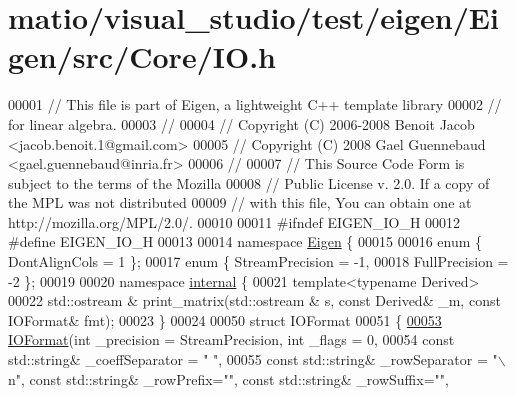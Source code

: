 \hypertarget{matio_2visual__studio_2test_2eigen_2_eigen_2src_2_core_2_i_o_8h_source}{}\section{matio/visual\+\_\+studio/test/eigen/\+Eigen/src/\+Core/\+IO.h}
\label{matio_2visual__studio_2test_2eigen_2_eigen_2src_2_core_2_i_o_8h_source}

\begin{DoxyCode}
00001 \textcolor{comment}{// This file is part of Eigen, a lightweight C++ template library}
00002 \textcolor{comment}{// for linear algebra.}
00003 \textcolor{comment}{//}
00004 \textcolor{comment}{// Copyright (C) 2006-2008 Benoit Jacob <jacob.benoit.1@gmail.com>}
00005 \textcolor{comment}{// Copyright (C) 2008 Gael Guennebaud <gael.guennebaud@inria.fr>}
00006 \textcolor{comment}{//}
00007 \textcolor{comment}{// This Source Code Form is subject to the terms of the Mozilla}
00008 \textcolor{comment}{// Public License v. 2.0. If a copy of the MPL was not distributed}
00009 \textcolor{comment}{// with this file, You can obtain one at http://mozilla.org/MPL/2.0/.}
00010 
00011 \textcolor{preprocessor}{#ifndef EIGEN\_IO\_H}
00012 \textcolor{preprocessor}{#define EIGEN\_IO\_H}
00013 
00014 \textcolor{keyword}{namespace }\hyperlink{namespace_eigen}{Eigen} \{ 
00015 
00016 \textcolor{keyword}{enum} \{ DontAlignCols = 1 \};
00017 \textcolor{keyword}{enum} \{ StreamPrecision = -1,
00018        FullPrecision = -2 \};
00019 
00020 \textcolor{keyword}{namespace }\hyperlink{namespaceinternal}{internal} \{
00021 \textcolor{keyword}{template}<\textcolor{keyword}{typename} Derived>
00022 std::ostream & print\_matrix(std::ostream & s, \textcolor{keyword}{const} Derived& \_m, \textcolor{keyword}{const} IOFormat& fmt);
00023 \}
00024 
00050 \textcolor{keyword}{struct }IOFormat
00051 \{
\hyperlink{group___core___module_a637b0b62f49a87c1396a904de46c4856}{00053}   \hyperlink{group___core___module_a637b0b62f49a87c1396a904de46c4856}{IOFormat}(\textcolor{keywordtype}{int} \_precision = StreamPrecision, \textcolor{keywordtype}{int} \_flags = 0,
00054     \textcolor{keyword}{const} std::string& \_coeffSeparator = \textcolor{stringliteral}{" "},
00055     \textcolor{keyword}{const} std::string& \_rowSeparator = \textcolor{stringliteral}{"\(\backslash\)n"}, \textcolor{keyword}{const} std::string& \_rowPrefix=\textcolor{stringliteral}{""}, \textcolor{keyword}{const} std::string& 
      \_rowSuffix=\textcolor{stringliteral}{""},

\end{DoxyCode}
